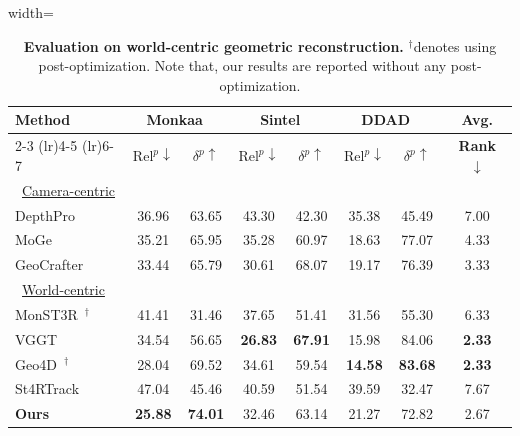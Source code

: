 \begin{table}[t]
\centering
\caption{
\textbf{Evaluation on world-centric geometric reconstruction.}
$^\dagger$denotes using post-optimization. 
Note that,
our results are reported without any post-optimization.
}
\vspace{-0.5em}
\label{tab:geo_only}
\begin{adjustbox}{width=\linewidth}
\begin{tabular}{@{}l cc cc cc c@{}}
\toprule
\multirow{2}{*}{\textbf{Method}} &
\multicolumn{2}{c}{\textbf{Monkaa}~\cite{mayer2016large}} &
\multicolumn{2}{c}{\textbf{Sintel}~\cite{sintel}} &
\multicolumn{2}{c}{\textbf{DDAD}~\cite{ddad2020}} &
\textbf{Avg.}  \\
\cmidrule(lr){2-3} \cmidrule(lr){4-5} \cmidrule(lr){6-7}
&
$\text{Rel}^{p}\!\downarrow$ & $\delta^{p}\!\uparrow$ &
$\text{Rel}^{p}\!\downarrow$ & $\delta^{p}\!\uparrow$ &
$\text{Rel}^{p}\!\downarrow$ & $\delta^{p}\!\uparrow$ &
\textbf{Rank} $\!\downarrow$
\\
\midrule
\ \underline{Camera-centric} & & & & & & & \\ 
DepthPro~\cite{bochkovskiy2025depth} & 36.96 & 63.65 & 43.30 & 42.30 & 35.38 & 45.49 & 7.00 \\
MoGe~\cite{wang2024moge} & 35.21 & 65.95 & 35.28 & 60.97 & 18.63 & 77.07 & 4.33 \\
GeoCrafter~\cite{xu2025geometrycrafter} & 33.44 & 65.79 & 30.61 & 68.07 & 19.17 & 76.39 & 3.33 \\
\midrule
\ \underline{World-centric} & & & & & & & \\
MonST3R~\cite{zhang24monst3r}$^\dagger$ & 41.41 & 31.46 & 37.65 & 51.41 & 31.56 & 55.30 & 6.33 \\
VGGT~\cite{wang2025vggt} & 34.54 & 56.65 & \textbf{26.83} & \textbf{67.91} & 15.98 & 84.06 & \textbf{2.33} \\
Geo4D~\cite{jiang2025geo4d}$^\dagger$ & 28.04 & 69.52 & 34.61 & 59.54 & \textbf{14.58} & \textbf{83.68} & \textbf{2.33} \\
St4RTrack~\cite{st4rtrack2025} & 47.04 & 45.46 & 40.59 & 51.54 & 39.59 & 32.47 & 7.67 \\
\textbf{Ours} & \textbf{25.88} & \textbf{74.01} & 32.46 & 63.14 & 21.27 & 72.82 & 2.67 \\
\bottomrule
\end{tabular}
\end{adjustbox}
\vspace{-1em}
\end{table}
